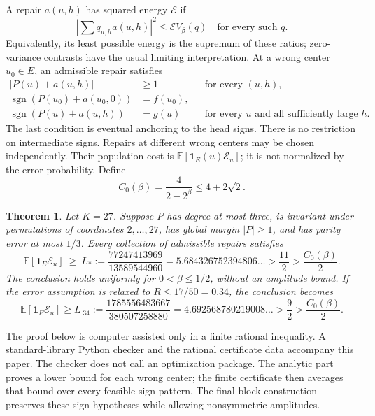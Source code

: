\documentclass[11pt]{article}
\newtheorem{theorem}{Theorem}
\newcommand{\E}{\mathbb E}
\newcommand{\sgn}{\operatorname{sgn}}
\newcommand{\cost}{\mathcal E}
\begin{document}
A repair $a(u,h)$ has squared energy $\cost$ if
\begin{equation}\label{eq:duality}
 \left|\sum q_{u,h}a(u,h)\right|^2\le \cost V_\beta(q)
 \quad\text{for every such }q.
\end{equation}
Equivalently, its least possible energy is the supremum of these ratios; zero-variance contrasts have the usual limiting interpretation. At a wrong center $u_0\in E$, an admissible repair satisfies
\begin{align*}
 |P(u)+a(u,h)|&\ge1 &&\text{for every }(u,h),\\
 \sgn(P(u_0)+a(u_0,0))&=f(u_0),\\
 \sgn(P(u)+a(u,h))&=g(u) &&\text{for every }u\text{ and all sufficiently large }h.
\end{align*}
The last condition is eventual anchoring to the head signs. There is no restriction on intermediate signs. Repairs at different wrong centers may be chosen independently. Their population cost is $\E[\mathbf1_E(u)\cost_u]$; it is not normalized by the error probability. Define
\[
 C_0(\beta)=\frac4{2-2^\beta}\le4+2\sqrt2.
\]

\begin{theorem}\label{thm:main}
Let $K=27$. Suppose $P$ has degree at most three, is invariant under permutations of coordinates $2,\ldots,27$, has global margin $|P|\ge1$, and has parity error at most $1/3$. Every collection of admissible repairs satisfies
\[
 \E[\mathbf1_E\cost_u]\ \ge\ L_*:=\frac{77247413969}{13589544960}
 =5.684326752394806\ldots>\frac{11}{2}>\frac{C_0(\beta)}2.
\]
The conclusion holds uniformly for $0<\beta\le1/2$, without an amplitude bound. If the error assumption is relaxed to $R\le17/50=0.34$, the conclusion becomes
\[
 \E[\mathbf1_E\cost_u]\ge L_{.34}:=\frac{1785556483667}{380507258880}
 =4.692568780219008\ldots>\frac92>\frac{C_0(\beta)}2.
\]
\end{theorem}

The proof below is computer assisted only in a finite rational inequality. A standard-library Python checker and the rational certificate data accompany this paper. The checker does not call an optimization package. The analytic part proves a lower bound for each wrong center; the finite certificate then averages that bound over every feasible sign pattern. The final block construction preserves these sign hypotheses while allowing nonsymmetric amplitudes.
\end{document}
